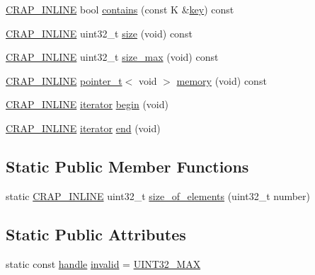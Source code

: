\begin{DoxyCompactItemize}
\item 
\hyperlink{config__x86_8h_a5a40526b8d842e7ff731509998bb0f1c}{C\+R\+A\+P\+\_\+\+I\+N\+L\+I\+N\+E} bool \hyperlink{classcrap_1_1sorted__map_abc9e9ffc3d4a79062e7eb69f81d2038b}{contains} (const K \&\hyperlink{classcrap_1_1sorted__map_a7b1a41d7af597537a793fb19e307716d}{key}) const 
\item 
\hyperlink{config__x86_8h_a5a40526b8d842e7ff731509998bb0f1c}{C\+R\+A\+P\+\_\+\+I\+N\+L\+I\+N\+E} uint32\+\_\+t \hyperlink{classcrap_1_1sorted__map_a6412f21fcbf09533705a9a8335f71706}{size} (void) const 
\item 
\hyperlink{config__x86_8h_a5a40526b8d842e7ff731509998bb0f1c}{C\+R\+A\+P\+\_\+\+I\+N\+L\+I\+N\+E} uint32\+\_\+t \hyperlink{classcrap_1_1sorted__map_abdcc6d8cfc992386751a523b4d89b62b}{size\+\_\+max} (void) const 
\item 
\hyperlink{config__x86_8h_a5a40526b8d842e7ff731509998bb0f1c}{C\+R\+A\+P\+\_\+\+I\+N\+L\+I\+N\+E} \hyperlink{structcrap_1_1pointer__t}{pointer\+\_\+t}$<$ void $>$ \hyperlink{classcrap_1_1sorted__map_a210f120fd31bd7acf356a4dd928376d4}{memory} (void) const 
\item 
\hyperlink{config__x86_8h_a5a40526b8d842e7ff731509998bb0f1c}{C\+R\+A\+P\+\_\+\+I\+N\+L\+I\+N\+E} \hyperlink{structcrap_1_1sorted__map_1_1iterator}{iterator} \hyperlink{classcrap_1_1sorted__map_a03eab2e5dab280e3d41765030e46595e}{begin} (void)
\item 
\hyperlink{config__x86_8h_a5a40526b8d842e7ff731509998bb0f1c}{C\+R\+A\+P\+\_\+\+I\+N\+L\+I\+N\+E} \hyperlink{structcrap_1_1sorted__map_1_1iterator}{iterator} \hyperlink{classcrap_1_1sorted__map_a214960ce94c3c6fe52c24eed8b93ec47}{end} (void)
\end{DoxyCompactItemize}
\subsection*{Static Public Member Functions}
\begin{DoxyCompactItemize}
\item 
static \hyperlink{config__x86_8h_a5a40526b8d842e7ff731509998bb0f1c}{C\+R\+A\+P\+\_\+\+I\+N\+L\+I\+N\+E} uint32\+\_\+t \hyperlink{classcrap_1_1sorted__map_aa62e9cb11df0a3f75efc8023a506e6a2}{size\+\_\+of\+\_\+elements} (uint32\+\_\+t number)
\end{DoxyCompactItemize}
\subsection*{Static Public Attributes}
\begin{DoxyCompactItemize}
\item 
static const \hyperlink{classcrap_1_1sorted__map_a741a562ba6e22dc1a20e103e75619189}{handle} \hyperlink{classcrap_1_1sorted__map_a7b811fbc23f5e2d5072a090728fb8b4f}{invalid} = \hyperlink{crap__types_8h_ab5eb23180f7cc12b7d6c04a8ec067fdd}{U\+I\+N\+T32\+\_\+\+M\+A\+X}
\end{DoxyCompactItemize}


